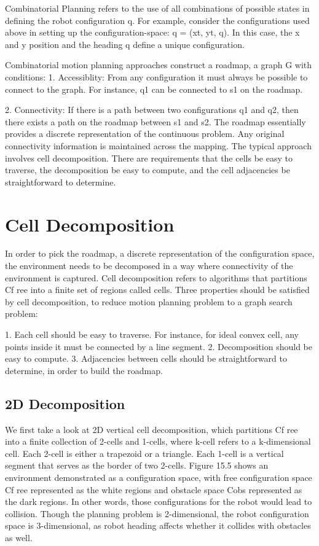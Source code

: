 \documentclass[twoside]{article}
\begin{document}
Combinatorial Planning refers to the use of all combinations of possible states in defining the robot configuration q. For example, consider the configurations used above in setting up the configuration-space: q = (xt, yt, q). In this case, the x and y position and the heading q define a unique configuration.

Combinatorial motion planning approaches construct a roadmap, a graph G with conditions:
1. Accessiblity: From any configuration it must always be possible to connect to the graph. For instance, q1 can be connected to s1 on the roadmap.

2. Connectivity: If there is a path between two configurations q1 and q2, then there exists a path on the roadmap between s1 and s2.
The roadmap essentially provides a discrete representation of the continuous problem. Any original connectivity information is maintained across the mapping.
The typical approach involves cell decomposition. There are requirements that the cells be easy to traverse, the decomposition be easy to compute, and the cell adjacencies be straightforward to determine.

\section{Cell Decomposition}
In order to pick the roadmap, a discrete representation of the configuration space, the environment needs to be decomposed in a way where connectivity of the environment is captured. Cell decomposition refers to algorithms that partitions Cf ree into a finite set of regions called cells. Three properties should be satisfied by cell decomposition, to reduce motion planning problem to a graph search problem:

1. Each cell should be easy to traverse. For instance, for ideal convex cell, any points inside it must be connected by a line segment.
2. Decomposition should be easy to compute.
3. Adjacencies between cells should be straightforward to determine, in order to build the roadmap.

\subsection{2D Decomposition}
We first take a look at 2D vertical cell decomposition, which partitions Cf ree into a finite collection of 2-cells and 1-cells, where k-cell refers to a k-dimensional cell. Each 2-cell is either a trapezoid or a triangle.
Each 1-cell is a vertical segment that serves as the border of two 2-cells. Figure 15.5 shows an environment demonstrated as a configuration space, with free configuration space Cf ree represented as the white regions and obstacle space Cobs represented as the dark regions. In other words, those configurations for the robot would lead to collision. Though the planning problem is 2-dimensional, the robot configuration space is 3-dimensional, as robot heading affects whether it collides with obstacles as well.
\end{document}
